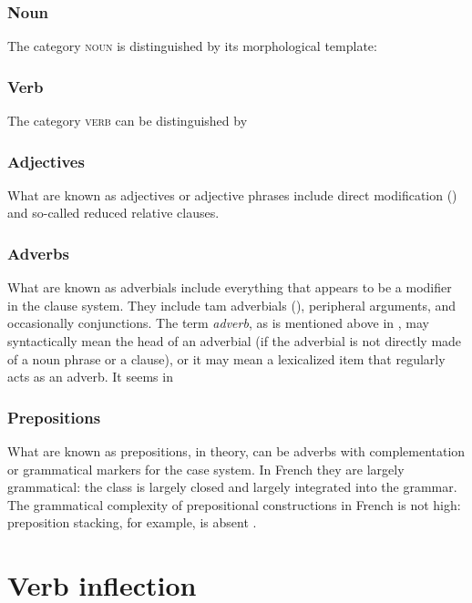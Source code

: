 \documentclass[a4paper, oneside, 12pt]{report}
\newcommand*{\term}[1]{\emph{#1}}
\newcommand*{\category}[1]{\textsc{#1}}
\begin{document}
\subsection{Noun}

The category \category{noun} is distinguished by its morphological template:

\subsection{Verb}

The category \category{verb} can be distinguished by 

\subsection{Adjectives}\label{sec:grammatical.pos.adjective}

What are known as adjectives or adjective phrases include direct modification
()
and so-called reduced relative clauses.

\subsection{Adverbs}

What are known as adverbials include everything that appears to be a modifier in the clause system.
They include \ac{tam} adverbials (),
peripheral arguments,
and occasionally conjunctions.
The term \term{adverb}, as is mentioned above in ,
may syntactically mean the head of an adverbial (if the adverbial is not directly made of a noun phrase or a clause),
or it may mean a lexicalized item that regularly acts as an adverb.
It seems in 

\subsection{Prepositions}

What are known as prepositions, in theory, can be adverbs with complementation
or grammatical markers for the case system.
In French they are largely grammatical:
the class is largely closed and largely integrated into the grammar.
The grammatical complexity of prepositional constructions in French is not high:
preposition stacking, for example, is absent .

\chapter{Verb inflection}
\end{document}
